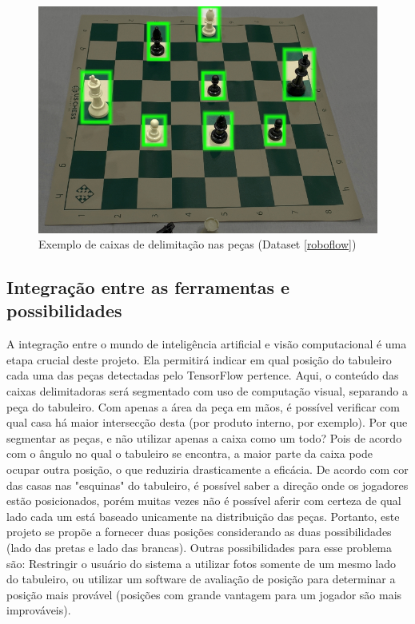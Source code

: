 \documentclass[a4paper,12pt,twoside]{article}
\begin{document}
\begin{figure}[h!]
\centering
  \includegraphics[width=0.7\linewidth]{fig/delimitar.jpg}
  \caption{Exemplo de caixas de delimitação nas peças (Dataset \ref{roboflow})}
\label{fig:delimitar}
\end{figure}

\subsection{Integração entre as ferramentas e possibilidades}

A integração entre o mundo de inteligência artificial e visão computacional é uma etapa crucial deste projeto.
Ela permitirá indicar em qual posição do tabuleiro cada uma das peças detectadas pelo TensorFlow pertence.
Aqui, o conteúdo das caixas delimitadoras será segmentado com uso de computação visual, separando a peça do tabuleiro.
Com apenas a área da peça em mãos,
é possível verificar com qual casa há maior intersecção desta (por produto interno, por exemplo).
Por que segmentar as peças, e não utilizar apenas a caixa como um todo?
Pois de acordo com o ângulo no qual o tabuleiro se encontra,
a maior parte da caixa pode ocupar outra posição, o que reduziria drasticamente a eficácia.
De acordo com cor das casas nas "esquinas" do tabuleiro,
é possível saber a direção onde os jogadores estão posicionados,
porém muitas vezes não é possível aferir com certeza de qual lado cada um está baseado unicamente na distribuição das peças.
Portanto, este projeto se propõe a fornecer duas posições considerando as duas possibilidades
(lado das pretas e lado das brancas).
Outras possibilidades para esse problema são:
Restringir o usuário do sistema a utilizar fotos somente de um mesmo lado do tabuleiro,
ou utilizar um software de avaliação de posição para determinar a posição mais provável
(posições com grande vantagem para um jogador são mais improváveis).
\end{document}
